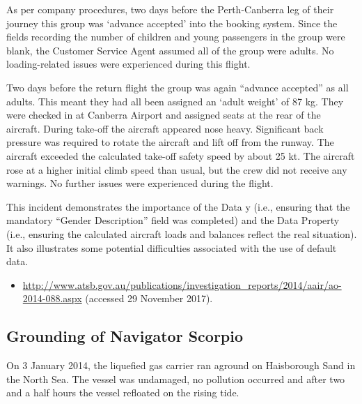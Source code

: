 As per company procedures, two days before the Perth-Canberra leg of their journey this group was `advance accepted' into the booking system. Since the fields recording the number of children and young passengers in the group were blank, the Customer Service Agent assumed all of the group were adults. No loading-related issues were experienced during this flight.

Two days before the return flight the group was again ``advance accepted'' as all adults. This meant they had all been assigned an `adult weight' of 87 kg. They were checked in at Canberra Airport and assigned seats at the rear of the aircraft. During take-off the aircraft appeared nose heavy. Significant back pressure was required to rotate the aircraft and lift off from the runway. The aircraft exceeded the calculated take-off safety speed by about 25 kt. The aircraft rose at a higher initial climb speed than usual, but the crew did not receive any warnings. No further issues were experienced during the flight.

This incident demonstrates the importance of the  Data y (i.e., ensuring that the mandatory ``Gender Description'' field was completed) and the  Data Property (i.e., ensuring the calculated aircraft loads and balances reflect the real situation). It also illustrates some potential difficulties associated with the use of default data.

\begin{samepage}
\begin{itemize}
  \item \raggedright{\href{http://www.atsb.gov.au/publications/investigation_reports/2014/aair/ao-2014-088.aspx}{http://www.atsb.gov.au/publications/investigation\_reports/2014/aair/ao-2014-088.aspx} (accessed 29 November 2017).}
\end{itemize}
\end{samepage}


\subsection{Grounding of Navigator Scorpio} \label{bkm:incacc:navscor}
On 3 January 2014, the liquefied gas carrier  ran aground on Haisborough Sand in the North Sea. The vessel was undamaged, no pollution occurred and after two and a half hours the vessel refloated on the rising tide.

